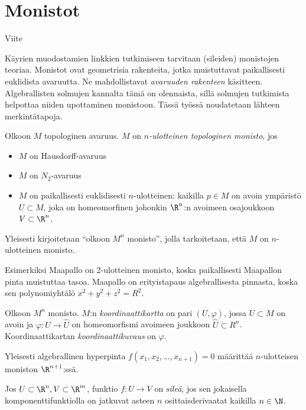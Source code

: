 \section{Monistot}
Viite \citep{Neumann1989}

Käyrien muodostamien linkkien tutkimiseen tarvitaan (sileiden) monistojen teoriaa. Monistot ovat geometrisia rakenteita, jotka muistuttavat paikallisesti euklidista avaruutta. Ne mahdollistavat \emph{avaruuden rakenteen} käsitteen. Algebrallisten solmujen kannalta tämä on olennaista, sillä solmujen tutkimista helpottaa niiden upottaminen monistoon. Tässä työssä noudatetaan lähteen \citep{Lee2012} merkintätapoja.
\begin{maaritelma}
    Olkoon $M$ topologinen avaruus. $M$ on \emph{$n$-ulotteinen topologinen monisto}, jos
    \begin{itemize}
        \item $M$ on Hausdorff-avaruus
        \item $M$ on $N_2$-avaruus
        \item $M$ on paikallisesti euklidisesti $n$-ulotteinen: kaikilla $p\in M$ on avoin ympäristö $U\subset M$, joka on homeomorfinen johonkin $\R^n$:n avoimeen osajoukkoon $V\subset\R^n$.
    \end{itemize}
\end{maaritelma}
\begin{huomautus}
    Yleisesti kirjoitetaan ``olkoon $M^n$ monisto'', jolla tarkoitetaan, että $M$ on $n$-ulotteinen monisto.
\end{huomautus}
\begin{esimerkki}
    Esimerkiksi Maapallo on 2-ulotteinen monisto, koska paikallisesti Maapallon pinta muistuttaa tasoa. Maapallo on erityistapaus algebrallisesta pinnasta, koska sen polynomiyhtälö $x^2+y^2+z^2=R^2$.
\end{esimerkki}
\begin{maaritelma}
    Olkoon $M^n$ monisto. $M$:n \emph{koordinaattikartta} on pari $(U,\varphi)$, jossa $U\subset M$ on avoin ja $\varphi:U\to\hat U$ on homeomorfismi avoimeen joukkoon $\hat U\subset R^n$. Koordinaattikartan \emph{koordinaattikuvaus} on $\varphi$.
\end{maaritelma}
\begin{esimerkki}
    Yleisesti algebrallinen hyperpinta $f(x_1,x_2,\dots,x_{n+1})=0$ määrittää $n$-ulotteisen moniston $\R^{n+1}$:ssä.
\end{esimerkki}
\begin{maaritelma}
    Jos $U\subset\R^n,V\subset\R^m$, funktio $f:U\to V$ on \emph{sileä}, jos sen jokaisella komponenttifunktiolla on jatkuvat asteen $n$ osittaisderivaatat kaikilla $n\in\N$.
\end{maaritelma}
